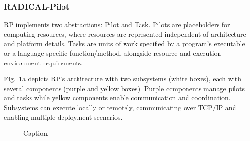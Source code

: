 \documentclass[preprint,12pt, a4paper]{elsarticle}
\begin{document}
\subsubsection{RADICAL-Pilot}\label{sssec:arch_rp}

RP implements two abstractions: Pilot and Task. Pilots are placeholders for
computing resources, where resources are represented independent of
architecture and platform details. Tasks are units of work specified by a
program's executable or a language-specific function/method, alongside resource
and execution environment requirements.

Fig.~\ref{fig:archs}a depicts RP's architecture with two subsystems (white
boxes), each with several components (purple and yellow boxes). Purple
components manage pilots and tasks while yellow components enable communication
and coordination. Subsystems can execute locally or remotely, communicating over
TCP/IP and enabling multiple deployment scenarios.


\begin{figure}
    \centering
    \qquad
     \caption{Caption. }\label{fig:archs}
\end{figure}
\end{document}
